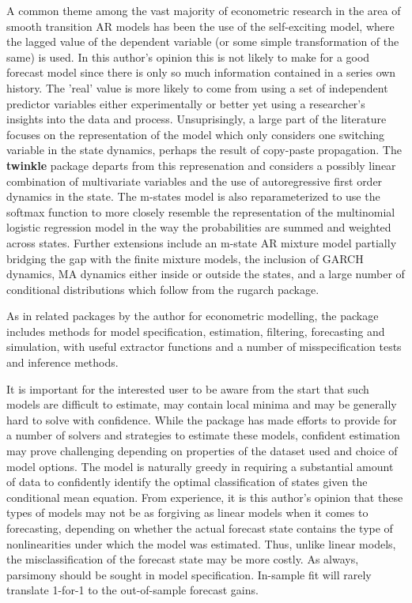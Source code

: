 A common theme among the vast majority of econometric research in the area of
smooth transition AR models has been the use of the self-exciting model,
where the lagged value of the dependent variable (or some simple transformation 
of the same) is used. In this author's opinion this is not likely to make for a
good forecast model since there is only so much information contained in a
series own history. The 'real' value is more likely to come from using a set of
independent predictor variables either experimentally or better yet using a
researcher's insights into the data and process. Unsuprisingly, a large part of
the literature focuses on the representation of the model which only considers
one switching variable in the state dynamics, perhaps the result of copy-paste
propagation. The \textbf{twinkle} package departs from this represenation 
and considers a possibly linear combination of multivariate variables and the
use of autoregressive first order dynamics in the state. The m-states model is
also reparameterized to use the softmax function to more closely resemble the
representation of the multinomial logistic regression model in the way the
probabilities are summed and weighted across states. Further extensions include
an m-state AR mixture model partially bridging the gap with the finite mixture
models, the inclusion of GARCH dynamics, MA dynamics either inside or outside 
the states, and a large number of conditional distributions which follow from
the rugarch package. 

As in related packages by the author for econometric modelling, the package
includes methods for model specification, estimation, filtering, forecasting and
simulation, with useful extractor functions and a number of misspecification tests 
and inference methods. 

It is important for the interested user to be aware from the start that such
models are difficult to estimate, may contain local minima and may be generally
hard to solve with confidence. While the package has made efforts to provide for a 
number of solvers and strategies to estimate these models, confident estimation
may prove challenging depending on properties of the dataset used and choice of 
model options. The model is naturally greedy in requiring a substantial amount of data to
confidently identify the optimal classification of states given the conditional
mean equation. From experience, it is this author's opinion that these types of
models may not be as forgiving as linear models when it comes to forecasting, 
depending on whether the actual forecast state contains the type of
nonlinearities under which the model was estimated. Thus, unlike linear
models, the misclassification of the forecast state may be more costly.
As always, parsimony should be sought in model specification. In-sample fit will
rarely translate 1-for-1 to the out-of-sample forecast gains.

